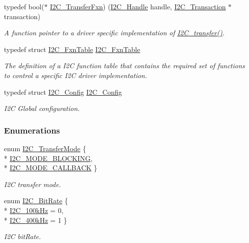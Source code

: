 \begin{DoxyCompactItemize}
typedef bool($\ast$ \hyperlink{_i2_c_8h_aa785484e689c79262f98208689fecd38}{I2\+C\+\_\+\+Transfer\+Fxn}) (\hyperlink{_i2_c_8h_a5809a229f8395c87f59e63128195c1bf}{I2\+C\+\_\+\+Handle} handle, \hyperlink{struct_i2_c___transaction}{I2\+C\+\_\+\+Transaction} $\ast$transaction)
\begin{DoxyCompactList}\small\item\em A function pointer to a driver specific implementation of \hyperlink{_i2_c_8h_ac5d827b67fe77d7d179026941cc069d7}{I2\+C\+\_\+transfer()}. \end{DoxyCompactList}\item 
typedef struct \hyperlink{struct_i2_c___fxn_table}{I2\+C\+\_\+\+Fxn\+Table} \hyperlink{_i2_c_8h_abdc2b5945fac9724271b088437881d68}{I2\+C\+\_\+\+Fxn\+Table}
\begin{DoxyCompactList}\small\item\em The definition of a I2\+C function table that contains the required set of functions to control a specific I2\+C driver implementation. \end{DoxyCompactList}\item 
typedef struct \hyperlink{struct_i2_c___config}{I2\+C\+\_\+\+Config} \hyperlink{_i2_c_8h_a06eeddd0e8a5dd24a18566b65099d588}{I2\+C\+\_\+\+Config}
\begin{DoxyCompactList}\small\item\em I2\+C Global configuration. \end{DoxyCompactList}\end{DoxyCompactItemize}
\subsubsection*{Enumerations}
\begin{DoxyCompactItemize}
\item 
enum \hyperlink{_i2_c_8h_a39f3b9340fc4ee241b0d2da9b2841c26}{I2\+C\+\_\+\+Transfer\+Mode} \{ \\*
\hyperlink{_i2_c_8h_a39f3b9340fc4ee241b0d2da9b2841c26abe065350be2a0ae5c9beb24624626c75}{I2\+C\+\_\+\+M\+O\+D\+E\+\_\+\+B\+L\+O\+C\+K\+I\+N\+G}, 
\\*
\hyperlink{_i2_c_8h_a39f3b9340fc4ee241b0d2da9b2841c26a129731a7edeb285f43a54b2cf9f5ac72}{I2\+C\+\_\+\+M\+O\+D\+E\+\_\+\+C\+A\+L\+L\+B\+A\+C\+K}
 \}
\begin{DoxyCompactList}\small\item\em I2\+C transfer mode. \end{DoxyCompactList}\item 
enum \hyperlink{_i2_c_8h_ac954e3197f04c50293db466c4abb6fbe}{I2\+C\+\_\+\+Bit\+Rate} \{ \\*
\hyperlink{_i2_c_8h_ac954e3197f04c50293db466c4abb6fbea966fd2df13b3a9825615c50335cf1987}{I2\+C\+\_\+100k\+Hz} = 0, 
\\*
\hyperlink{_i2_c_8h_ac954e3197f04c50293db466c4abb6fbea83cc3750242e6ae9194cd7ed94f764d9}{I2\+C\+\_\+400k\+Hz} = 1
 \}
\begin{DoxyCompactList}\small\item\em I2\+C bit\+Rate. \end{DoxyCompactList}\end{DoxyCompactItemize}
